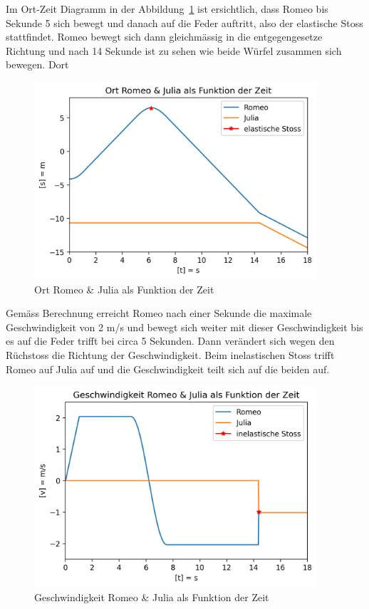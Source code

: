 \documentclass[../main.tex]{subfiles}
\begin{document}
    Im Ort-Zeit Diagramm in der Abbildung~\ref{fig:OrtRomeoJuliaAlsFunktionDerZeit} ist ersichtlich, dass Romeo bis Sekunde 5 sich bewegt und danach auf die Feder auftritt, also der elastische Stoss stattfindet. Romeo bewegt sich dann gleichmässig  in die entgegengesetze Richtung und nach 14 Sekunde ist zu sehen wie beide Würfel zusammen sich bewegen. Dort 

    \begin{figure}[H]
        \begin{center}
            \centerline{\includegraphics[width=105mm]{./images/Inelastisch/OrtRomeoJuliaAlsFunktionDerZeit}}
            \caption{Ort Romeo \& Julia als Funktion der Zeit}
            \label{fig:OrtRomeoJuliaAlsFunktionDerZeit}
        \end{center}
    \end{figure}

    Gemäss Berechnung erreicht Romeo nach einer Sekunde die maximale Geschwindigkeit von 2 m/s und bewegt sich weiter mit dieser Geschwindigkeit bis es auf die Feder trifft bei circa 5 Sekunden. Dann verändert sich wegen den Rüchstoss die Richtung der Geschwindigkeit. Beim inelastischen Stoss trifft Romeo auf Julia auf und die Geschwindigkeit teilt sich auf die beiden auf. 
    \begin{figure}[H]
        \begin{center}
            \centerline{\includegraphics[width=105mm]{./images/Inelastisch/GeschwindigkeitRomeoJulia}}
            \caption{Geschwindigkeit Romeo \& Julia als Funktion der Zeit}
            \label{fig:GeschwindigkeitRomeoJulia}
        \end{center}
    \end{figure}
\end{document}
